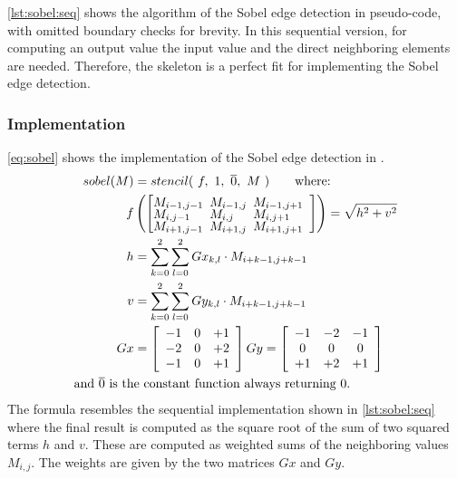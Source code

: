 \autoref{lst:sobel:seq} shows the algorithm of the Sobel edge detection in pseudo-code, with omitted boundary checks for brevity.
In this sequential version, for computing an output value  the input value  and the direct neighboring elements are needed.
Therefore, the \stencil skeleton is a perfect fit for implementing the Sobel edge detection.

\subsubsection*{\SkelCL Implementation}
\autoref{eq:sobel} shows the implementation of the Sobel edge detection in \SkelCL.
\begin{align}
  \label{eq:sobel}
  sobel(M)& = stencil(\ f,\ 1,\ \overline{0},\ M\ ) \qquad\text{where:}\\
  f&\left(\left[\begin{array}{lll}%
      \hspace{-.5em} M_{i-1,j-1}& \hspace{-.5em} M_{i-1,j} & \hspace{-.5em}M_{i-1,j+1}\vspace{-.25em}\\%
      \hspace{-.5em} M_{i,j-1}& \hspace{-.5em} M_{i,j} & \hspace{-.5em}M_{i,j+1}\vspace{-.25em}\\%
      \hspace{-.5em} M_{i+1,j-1}& \hspace{-.5em} M_{i+1,j} & \hspace{-.5em}M_{i+1,j+1}\vspace{-.25em}
    \end{array}\right] \right) = \displaystyle\sqrt{ h^2 + v^2 }\nonumber\\
  h & = \sum_{k=0}^2 \sum_{l=0}^2 Gx_{k, l}\cdot M_{i+k-1,j+k-1}\nonumber\\
  v & = \sum_{k=0}^2 \sum_{l=0}^2 Gy_{k, l}\cdot M_{i+k-1,j+k-1}\nonumber\\
  Gx& = \left[\begin{array}{ccc}%
      -1&0&+1\\
      -2&0&+2\\
      -1&0&+1
    \end{array}\right]
  Gy = \left[\begin{array}{ccc}%
      -1&-2&-1\\
      0&0&0\\
      +1&+2&+1
    \end{array}\right] \nonumber\\
  \text{and } \overline{0} \text{ is th}&\text{e constant function always returning 0.}\nonumber
\end{align}
The formula resembles the sequential implementation shown in \autoref{lst:sobel:seq} where the final result is computed as the square root of the sum of two squared terms $h$ and $v$.
These are computed as weighted sums of the neighboring values $M_{i,j}$.
The weights are given by the two matrices $Gx$ and $Gy$.

